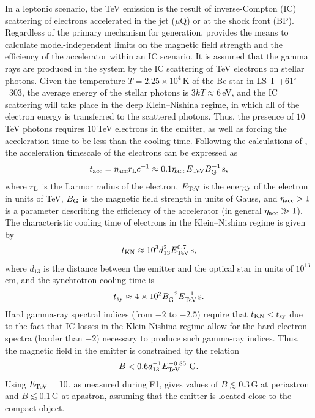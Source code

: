 \documentclass[preprint2]{aastex}
\newcommand{\tapp}{\raisebox{0.5ex}{\texttildelow}}
\newcommand{\lsi}{LS~I~+61$^{\circ}$~303}
\newcommand{\tev}{\,TeV}
\begin{document}
 In a leptonic scenario, the TeV emission is the result of inverse-Compton (IC) scattering of electrons accelerated in the jet ($\mu$Q) or at the shock front (BP). Regardless of the primary mechanism for generation, \citet{2008MNRAS.383..467K} provides the means to calculate model-independent limits on the magnetic field strength and the efficiency of the accelerator within an IC scenario. It is assumed that the gamma rays are produced in the system by the IC scattering of TeV electrons on stellar photons. Given the temperature $T=2.25\times10^4$\,K \citep{2013A&ARv..21...64D} of the Be star in \lsi{}, the average energy of the stellar photons is $3kT \approx 6$\,eV, and the IC scattering will take place in the deep Klein--Nishina regime, in which all of the electron energy is transferred to the scattered photons. Thus, the presence of \tapp{}$10$\tev{} photons requires \tapp{}$10$\tev{} electrons in the emitter, as well as forcing the acceleration time to be less than the cooling time. Following the calculations of \citet{2008MNRAS.383..467K}, the acceleration timescale of the electrons can be expressed as
\begin{equation}
t_{\mbox{\scriptsize{acc}}} = \eta_{\mbox{\scriptsize{acc}}} r_{\mbox{\scriptsize{L}}} c^{-1} \approx 0.1 \eta_{\mbox{\scriptsize{acc}}} E_{\mbox{\scriptsize{TeV}}} B_{\mbox{\scriptsize{G}}}^{-1} \mbox{\,s},
\label{taccel}
\end{equation}
where $r_{\mbox{\scriptsize{L}}}$ is the Larmor radius of the electron, $E_{\mbox{\scriptsize{TeV}}}$ is the energy of the electron in units of TeV, $B_{\mbox{\scriptsize{G}}}$ is the magnetic field strength in units of Gauss, and $\eta_{\mbox{\scriptsize{acc}}} > 1$ is a parameter describing the efficiency of the accelerator (in general $\eta_{\mbox{\scriptsize{acc}}} \gg 1$). The characteristic cooling time of electrons in the Klein--Nishina regime is given by
\begin{equation}
t_{\mbox{\scriptsize{KN}}} \approx 10^3 d_{13}^2 E_{\mbox{\scriptsize{TeV}}}^{0.7} \mbox{\,s},
\end{equation}
where $d_{13}$ is the distance between the emitter and the optical star in units of $10^{13}$\,cm, and the synchrotron cooling time is 
\begin{equation}
t_{\mbox{\scriptsize{sy}}} \approx 4\times10^2 B_{\mbox{\scriptsize{G}}}^{-2} E_{\mbox{\scriptsize{TeV}}}^{-1} \mbox{\,s}.
\end{equation}
Hard gamma-ray spectral indices (from $-2$ to $-2.5$) require that $t_{\mbox{\scriptsize{KN}}} < t_{\mbox{\scriptsize{sy}}}$ due to the fact that IC losses in the Klein-Nishina regime allow for the hard electron spectra (harder than $-2$) necessary to produce such gamma-ray indices. Thus, the magnetic field in the emitter is constrained by the relation
\begin{equation}
{B < 0.6 d_{13}^{-1} E_{\mbox{\scriptsize{TeV}}}^{-0.85} \,\mbox{\,G}}.
\end{equation}
Using $ E_{\mbox{\scriptsize{TeV}}} = 10$, as measured during F1, gives values of $B \lesssim 0.3$\,G at periastron and $B \lesssim 0.1$\,G at apastron, assuming that the emitter is located close to the compact object.
\end{document}
